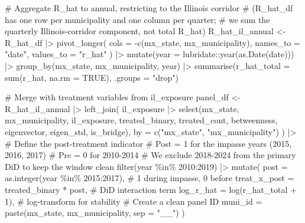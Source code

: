 \documentclass[
  11pt,
  letterpaper,
  DIV=11,
  numbers=noendperiod]{scrartcl}
\newenvironment{Shaded}{}{}
\newcommand{\AttributeTok}[1]{\textcolor[rgb]{0.84,0.23,0.29}{#1}}
\newcommand{\CommentTok}[1]{\textcolor[rgb]{0.42,0.45,0.49}{#1}}
\newcommand{\ConstantTok}[1]{\textcolor[rgb]{0.00,0.36,0.77}{#1}}
\newcommand{\DecValTok}[1]{\textcolor[rgb]{0.00,0.36,0.77}{#1}}
\newcommand{\FunctionTok}[1]{\textcolor[rgb]{0.44,0.26,0.76}{#1}}
\newcommand{\NormalTok}[1]{\textcolor[rgb]{0.14,0.16,0.18}{#1}}
\newcommand{\OtherTok}[1]{\textcolor[rgb]{0.44,0.26,0.76}{#1}}
\newcommand{\SpecialCharTok}[1]{\textcolor[rgb]{0.00,0.36,0.77}{#1}}
\newcommand{\StringTok}[1]{\textcolor[rgb]{0.01,0.18,0.38}{#1}}
\begin{document}
\begin{Shaded}
\begin{Highlighting}[]
\CommentTok{\# Aggregate R\_hat to annual, restricting to the Illinois corridor}
\CommentTok{\# (R\_hat\_df has one row per municipality and one column per quarter;}
\CommentTok{\#  we sum the quarterly Illinois{-}corridor component, not total R\_hat)}
\NormalTok{R\_hat\_il\_annual }\OtherTok{\textless{}{-}}\NormalTok{ R\_hat\_df }\SpecialCharTok{|\textgreater{}}
  \FunctionTok{pivot\_longer}\NormalTok{(}
    \AttributeTok{cols      =} \SpecialCharTok{{-}}\FunctionTok{c}\NormalTok{(mx\_state, mx\_municipality),}
    \AttributeTok{names\_to  =} \StringTok{"date"}\NormalTok{,}
    \AttributeTok{values\_to =} \StringTok{"r\_hat"}
\NormalTok{  ) }\SpecialCharTok{|\textgreater{}}
  \FunctionTok{mutate}\NormalTok{(}\AttributeTok{year =}\NormalTok{ lubridate}\SpecialCharTok{::}\FunctionTok{year}\NormalTok{(}\FunctionTok{as.Date}\NormalTok{(date))) }\SpecialCharTok{|\textgreater{}}
  \FunctionTok{group\_by}\NormalTok{(mx\_state, mx\_municipality, year) }\SpecialCharTok{|\textgreater{}}
  \FunctionTok{summarise}\NormalTok{(}\AttributeTok{r\_hat\_total =} \FunctionTok{sum}\NormalTok{(r\_hat, }\AttributeTok{na.rm =} \ConstantTok{TRUE}\NormalTok{), }\AttributeTok{.groups =} \StringTok{"drop"}\NormalTok{)}

\CommentTok{\# Merge with treatment variables from il\_exposure}
\NormalTok{panel\_df }\OtherTok{\textless{}{-}}\NormalTok{ R\_hat\_il\_annual }\SpecialCharTok{|\textgreater{}}
  \FunctionTok{left\_join}\NormalTok{(}
\NormalTok{    il\_exposure }\SpecialCharTok{|\textgreater{}}
      \FunctionTok{select}\NormalTok{(mx\_state, mx\_municipality,}
\NormalTok{             il\_exposure, treated\_binary, treated\_cont,}
\NormalTok{             betweenness, eigenvector, eigen\_std, is\_bridge),}
    \AttributeTok{by =} \FunctionTok{c}\NormalTok{(}\StringTok{"mx\_state"}\NormalTok{, }\StringTok{"mx\_municipality"}\NormalTok{)}
\NormalTok{  ) }\SpecialCharTok{|\textgreater{}}
  \CommentTok{\# Define the post{-}treatment indicator}
  \CommentTok{\# Post = 1 for the impasse years (2015, 2016, 2017)}
  \CommentTok{\# Pre  = 0 for 2010{-}2014}
  \CommentTok{\# We exclude 2018{-}2024 from the primary DiD to keep the window clean}
  \FunctionTok{filter}\NormalTok{(year }\SpecialCharTok{\%in\%} \DecValTok{2010}\SpecialCharTok{:}\DecValTok{2019}\NormalTok{) }\SpecialCharTok{|\textgreater{}}
  \FunctionTok{mutate}\NormalTok{(}
    \AttributeTok{post         =} \FunctionTok{as.integer}\NormalTok{(year }\SpecialCharTok{\%in\%} \DecValTok{2015}\SpecialCharTok{:}\DecValTok{2017}\NormalTok{),   }\CommentTok{\# 1 during impasse, 0 before}
    \AttributeTok{treat\_x\_post =}\NormalTok{ treated\_binary }\SpecialCharTok{*}\NormalTok{ post,              }\CommentTok{\# DiD interaction term}
    \AttributeTok{log\_r\_hat    =} \FunctionTok{log}\NormalTok{(r\_hat\_total }\SpecialCharTok{+} \DecValTok{1}\NormalTok{),               }\CommentTok{\# log{-}transform for stability}
    \CommentTok{\# Create a clean panel ID}
    \AttributeTok{muni\_id      =} \FunctionTok{paste}\NormalTok{(mx\_state, mx\_municipality, }\AttributeTok{sep =} \StringTok{"\_\_"}\NormalTok{)}
\NormalTok{  )}


\end{Highlighting}
\end{Shaded}
\end{document}
